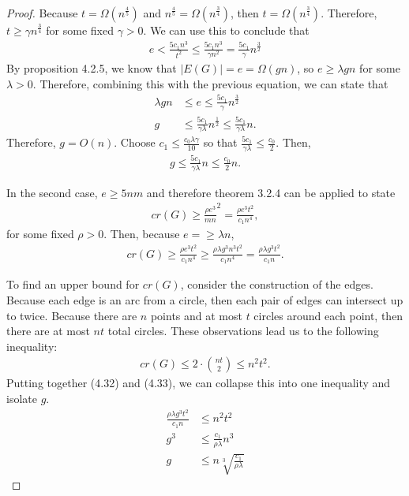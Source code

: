 \documentclass{scrippsthesisclass}
\theoremstyle{definition}
\begin{document}
\begin{proof}
Because $t = \Omega(n^{\frac{4}{5}})$ and $n^{\frac{4}{5}} = \Omega(n^{\frac{3}{4}})$, then $t = \Omega(n^{\frac{3}{4}})$. 
Therefore, $t \geq \gamma n^{\frac{3}{4}}$ for some fixed $\gamma > 0$. 
We can use this to conclude that 
\begin{align}
    e < \frac{5c_1 n^3}{t^2} \leq \frac{5c_1 n^3}{\gamma n^2} = \frac{5c_1}{\gamma} n^{\frac{3}{2}}
\end{align}
By proposition 4.2.5, we know that $|E(G)| = e = \Omega(gn)$, so $e \geq \lambda gn$ for some $\lambda > 0$.
Therefore, combining this with the previous equation, we can state that
\begin{align}
    \lambda gn & \leq e \leq \frac{5c_1}{\gamma} n^{\frac{3}{2}}\\
    g & \leq \frac{5c_1}{\gamma \lambda} n^{\frac{1}{2}} \leq \frac{5c_1}{\gamma \lambda} n.
\end{align}
Therefore, $g = O(n)$.
Choose $c_1 \leq \frac{c_0 \lambda \gamma}{10}$ so that $\frac{5c_1}{\gamma \lambda} \leq \frac{c_0}{2}$. 
Then, 
\begin{align}
    g \leq \frac{5c_1}{\gamma \lambda} n \leq \frac{c_0}{2} n.
\end{align}

In the second case, $e \geq 5nm$ and therefore theorem 3.2.4 can be applied to state
\begin{align}
    cr(G) \geq \frac{\rho e^3}{mn}^2 = \frac{\rho e^3 t^2}{c_1 n^4},
\end{align}
for some fixed $\rho > 0$.
Then, because $e =\geq \lambda n$, 
\begin{align}
     cr(G) \geq \frac{\rho e^3 t^2}{c_1 n^4} \geq \frac{\rho \lambda g^3 n^3 t^2}{c_1 n^4} = \frac{\rho \lambda g^3 t^2}{c_1 n}.
\end{align}

To find an upper bound for $cr(G)$, consider the construction of the edges. 
Because each edge is an arc from a circle, then each pair of edges can intersect up to twice. 
Because there are $n$ points and at most $t$ circles around each point, then there are at most $nt$ total circles.
These observations lead us to the following inequality:
\begin{align}
    cr(G) \leq 2 \cdot {nt \choose 2} \leq n^2t^2.
\end{align}
Putting together (4.32) and (4.33), we can collapse this into one inequality and isolate $g$.
\begin{align}
    \frac{\rho \lambda g^3 t^2}{c_1 n} & \leq n^2t^2\\
    g^3 & \leq \frac{c_1}{\rho \lambda} n^3\\
    g & \leq n \sqrt[3]{\frac{c_1}{\rho \lambda}}
\end{align}



\end{proof}
\end{document}
